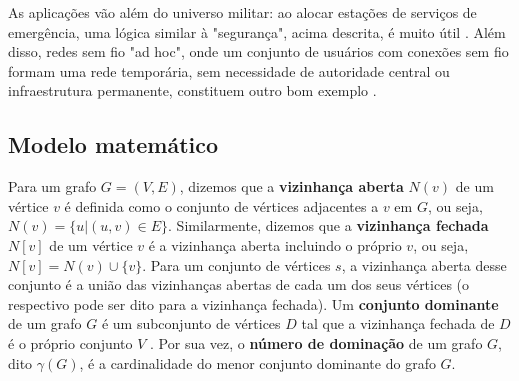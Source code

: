 \documentclass[11pt]{article}
\begin{document}
As aplicações vão além do universo militar: ao alocar estações de serviços de emergência, uma lógica similar à "segurança", acima descrita, é muito útil \autocite{GhaffariHadigheh2019Romandominationproblem}.
Além disso, redes sem fio "ad hoc", onde um conjunto de usuários com conexões sem fio formam uma rede temporária, sem necessidade de autoridade central ou infraestrutura permanente, constituem outro bom exemplo \autocite{Wu2000Dominationitsapplications}.


\subsection{Modelo matemático}
\label{sec:org46fa19b}
Para um grafo \(G = (V, E)\), dizemos que a \textbf{vizinhança aberta} \(N(v)\) de um vértice \(v\) é definida como o conjunto de vértices adjacentes a \(v\) em \(G\), ou seja, \(N(v) = \{u|(u, v) \in E\}\).
Similarmente, dizemos que a \textbf{vizinhança fechada} \(N[v]\) de um vértice \(v\) é a vizinhança aberta incluindo o próprio \(v\), ou seja, \(N[v] = N(v) \cup \{v\}\).
Para um conjunto de vértices \(s\), a vizinhança aberta desse conjunto é a união das vizinhanças abertas de cada um dos seus vértices (o respectivo pode ser dito para a vizinhança fechada).
Um \textbf{conjunto dominante} de um grafo \(G\) é um subconjunto de vértices \(D\) tal que a vizinhança fechada de \(D\) é o próprio conjunto \(V\) .
Por sua vez, o \textbf{número de dominação} de um grafo \(G\), dito \(\gamma(G)\), é a cardinalidade do menor conjunto dominante do grafo \(G\).
\end{document}
